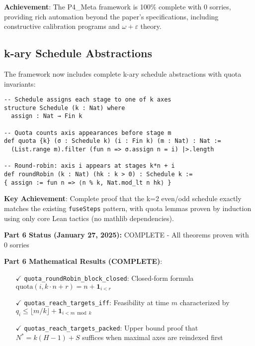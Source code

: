 \documentclass[11pt]{article}
\theoremstyle{definition}
\theoremstyle{remark}
\begin{document}
\begin{mdframed}[style=achievement]
\textbf{Achievement}: The P4\_Meta framework is 100\% complete with 0 sorries, providing rich automation beyond the paper's specifications, including constructive calibration programs and $\omega+\varepsilon$ theory.
\end{mdframed}

\subsection{k-ary Schedule Abstractions}

The framework now includes complete k-ary schedule abstractions with quota invariants:

\begin{lstlisting}[language={}]
-- Schedule assigns each stage to one of k axes
structure Schedule (k : Nat) where
  assign : Nat → Fin k

-- Quota counts axis appearances before stage m  
def quota {k} (σ : Schedule k) (i : Fin k) (m : Nat) : Nat :=
  (List.range m).filter (fun n => σ.assign n = i) |>.length

-- Round-robin: axis i appears at stages k*n + i
def roundRobin (k : Nat) (hk : k > 0) : Schedule k :=
{ assign := fun n => ⟨n % k, Nat.mod_lt n hk⟩ }
\end{lstlisting}

\textbf{Key Achievement}: Complete proof that the k=2 even/odd schedule exactly matches the existing \texttt{fuseSteps} pattern, with quota lemmas proven by induction using only core Lean tactics (no mathlib dependencies).

\begin{mdframed}[style=status]
\textbf{Part 6 Status (January 27, 2025):} COMPLETE - All theorems proven with 0 sorries
\end{mdframed}

\textbf{Part 6 Mathematical Results (COMPLETE)}:
\begin{itemize}
\item[$\checkmark$] \texttt{quota\_roundRobin\_block\_closed}: Closed-form formula $\text{quota}(i, k \cdot n + r) = n + \mathbf{1}_{i < r}$
\item[$\checkmark$] \texttt{quotas\_reach\_targets\_iff}: Feasibility at time $m$ characterized by $q_i \leq \lfloor m/k \rfloor + \mathbf{1}_{i < m \bmod k}$  
\item[$\checkmark$] \texttt{quotas\_reach\_targets\_packed}: Upper bound proof that $N^* = k(H-1) + S$ suffices when maximal axes are reindexed first
\end{itemize}
\end{document}
